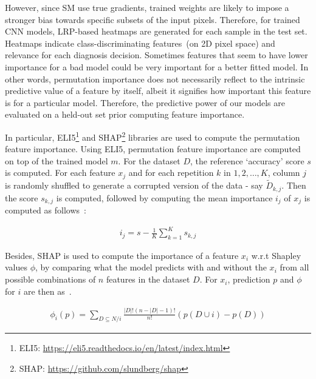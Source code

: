 \hspace*{3.5mm} However, since SM use true gradients, trained weights are likely to impose a stronger bias towards specific subsets of the input pixels. Therefore, for trained CNN models, LRP-based heatmaps are generated for each sample in the test set. Heatmaps indicate class-discriminating features~(on 2D pixel space) and relevance for each diagnosis decision. Sometimes features that seem to have lower importance for a bad model could be very important for a better fitted model. In other words,  permutation importance does not necessarily reflect to the intrinsic predictive value of a feature by itself, albeit it signifies how important this feature is for a particular model. Therefore, the predictive power of our models are evaluated on a held-out set prior computing feature importance. 

\hspace*{3.5mm} In particular, ELI5\footnote{ELI5: \url{https://eli5.readthedocs.io/en/latest/index.html}} and SHAP\footnote{SHAP: \url{https://github.com/slundberg/shap}} libraries are used to compute the permutation feature importance. Using ELI5, permutation feature importance are computed on top of the trained model $m$. For the dataset $D$, the reference `accuracy' score $s$ is computed. For each feature $x_j$ and for each repetition $k$ in $1, 2, \ldots, K$, column $j$ is randomly shuffled to generate a corrupted version of the data - say $\tilde{D}_{k,j}$. Then the score $s_{k,j}$ is computed, followed by computing the mean importance $i_{j}$ of $x_{j}$ is computed as follows~\cite{SHAP}:

\vspace{-2mm}
\begin{align}
    i_{j}=s-\frac{1}{K} \sum_{k=1}^{K} s_{k,j}
\end{align}

\hspace*{3.5mm} Besides, SHAP is used to compute the importance of a feature $x_i$ w.r.t Shapley values $\phi$, by comparing what the model predicts with and without the $x_i$ from all possible combinations of $n$ features in the dataset $D$. For $x_i$, prediction $p$ and $\phi$ for $i$ are then as~\cite{NIPS2017_7062}. 

\vspace{-2mm}
\begin{align}
    \phi_{i}(p)=\sum_{D \subseteq N / i} \frac{|D| !(n-|D|-1) !}{n !}(p(D \cup i)-p(D))
    \label{eq:shap}
\end{align}


